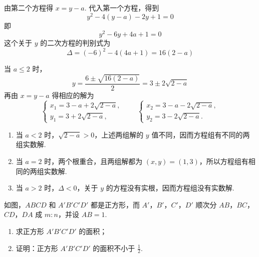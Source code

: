 \begin{solution}
由第二个方程得 \(x=y-a\). 代入第一个方程，得到
\[
y^2-4\left(y-a\right)-2y+1=0
\]
即
\[
y^2-6y+4a+1=0
\]
这个关于 \(y\) 的二次方程的判别式为
\[
\Delta=(-6)^2-4\left(4a+1\right)=16\left(2-a\right)
\]

当 \(a\leq2\) 时，
\[
y=\frac{6\pm\sqrt{16\left(2-a\right)}}{2}=3\pm2\sqrt{2-a}
\]
再由 \(x=y-a\) 得相应的解为
\[
\begin{cases}
x_1=3-a+2\sqrt{2-a},\\
y_1=3+2\sqrt{2-a},
\end{cases}
\qquad
\begin{cases}
x_2=3-a-2\sqrt{2-a},\\
y_2=3-2\sqrt{2-a}.
\end{cases}
\]

\begin{enumerate}
\item 当 \(a<2\) 时，\(\sqrt{2-a}>0\)，上述两组解的 \(y\) 值不同，因而方程组有不同的两组实数解.

\item 当 \(a=2\) 时，两个根重合，且两组解都为 \((x,y)=(1,3)\)，所以方程组有相同的两组实数解.

\item 当 \(a>2\) 时，\(\Delta<0\)，关于 \(y\) 的方程没有实根，因而方程组没有实数解.
\end{enumerate}
\end{solution}

\begin{problem}
如图，\(ABCD\) 和 \(A'B'C'D'\) 都是正方形，而 \(A'\)，\(B'\)，\(C'\)，\(D'\) 顺次分 \(AB\)，\(BC\)，\(CD\)，\(DA\) 成 \(m:n\)，并设 \(AB=1\).

\begin{enumerate}
\item 求正方形 \(A'B'C'D'\) 的面积；
\item 证明：正方形 \(A'B'C'D'\) 的面积不小于 \(\frac12\).
\end{enumerate}

\end{problem}

